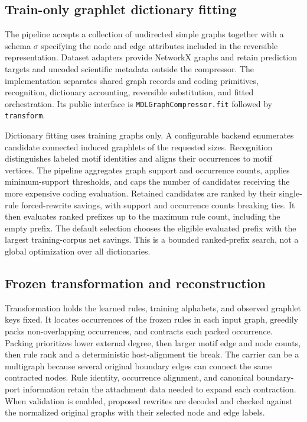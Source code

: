 \subsection{Train-only graphlet dictionary fitting}
\label{sec:graphlet-pipeline}

The pipeline accepts a collection of undirected simple graphs together with
a schema $\sigma$ specifying the node and edge attributes included in the
reversible representation. Dataset adapters provide NetworkX graphs and retain
prediction targets and uncoded scientific metadata outside the compressor.
The implementation separates shared graph records and coding primitives,
recognition, dictionary accounting, reversible substitution, and fitted
orchestration. Its public interface is
\texttt{MDLGraphCompressor.fit} followed by \texttt{transform}.

Dictionary fitting uses training graphs only. A configurable backend enumerates
candidate connected induced graphlets of the requested sizes. Recognition
distinguishes labeled motif identities and aligns their occurrences to motif
vertices. The pipeline aggregates graph support and occurrence counts, applies
minimum-support thresholds, and caps the number of candidates receiving the
more expensive coding evaluation. Retained candidates are ranked by their
single-rule forced-rewrite savings, with support and occurrence counts breaking
ties. It then evaluates ranked prefixes up to the maximum rule count, including
the empty prefix. The default selection chooses the eligible evaluated prefix
with the largest training-corpus net savings. This is a bounded ranked-prefix
search, not a global optimization over all dictionaries.

\subsection{Frozen transformation and reconstruction}

Transformation holds the learned rules, training alphabets, and observed
graphlet keys fixed. It locates occurrences of the frozen rules in each input
graph, greedily packs non-overlapping occurrences, and contracts each packed
occurrence. Packing prioritizes lower external degree, then larger motif edge
and node counts, then rule rank and a deterministic host-alignment tie break.
The carrier can be a multigraph because several
original boundary edges can connect the same contracted nodes. Rule identity,
occurrence alignment, and canonical boundary-port information retain the
attachment data needed to expand each contraction. When validation is enabled,
proposed rewrites are decoded and checked against the normalized original
graphs with their selected node and edge labels.

